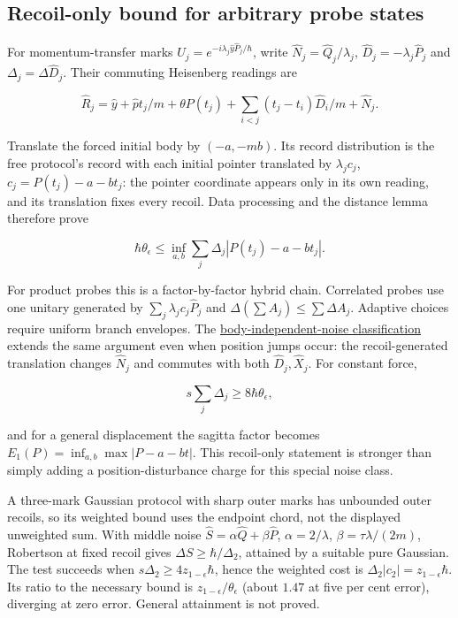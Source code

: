 \documentclass[11pt,a4paper]{article}
\begin{document}
\hypertarget{recoil-only-bound-for-arbitrary-probe-states}{%
\subsection{Recoil-only bound for arbitrary probe
states}\label{recoil-only-bound-for-arbitrary-probe-states}}

For momentum-transfer marks \(U_j=e^{-i\lambda_j\hat y\hat P_j/\hbar}\),
write \(\hat N_j=\hat Q_j/\lambda_j\), \(\hat D_j=-\lambda_j\hat P_j\)
and \(\Delta_j=\Delta\hat D_j\). Their commuting Heisenberg readings are

\[\hat R_j=\hat y+\hat p t_j/m+\theta P(t_j)
 +\sum_{i<j}(t_j-t_i)\hat D_i/m+\hat N_j.\]

Translate the forced initial body by \((-a,-mb)\). Its record
distribution is the free protocol's record with each initial pointer
translated by \(\lambda_jc_j\), \(c_j=P(t_j)-a-bt_j\): the pointer
coordinate appears only in its own reading, and its translation fixes
every recoil. Data processing and the distance lemma therefore prove

\[\hbar\theta_\epsilon\le\inf_{a,b}\sum_j\Delta_j|P(t_j)-a-bt_j|.\]

For product probes this is a factor-by-factor hybrid chain. Correlated
probes use one unitary generated by \(\sum_j\lambda_jc_j\hat P_j\) and
\(\Delta(\sum A_j)\le\sum\Delta A_j\). Adaptive choices require uniform
branch envelopes. The
\href{mark-cost-and-statistical-floor.md\#quantum-probe-cost-and-body-independent-noise}{body-independent-noise
classification} extends the same argument even when position jumps
occur: the recoil-generated translation changes \(\hat N_j\) and
commutes with both \(\hat D_j,\hat X_j\). For constant force,

\[\boxed{s\sum_j\Delta_j\ge8\hbar\theta_\epsilon,}\]

and for a general displacement the sagitta factor becomes
\(E_1(P)=\inf_{a,b}\max|P-a-bt|\). This recoil-only statement is
stronger than simply adding a position-disturbance charge for this
special noise class.

A three-mark Gaussian protocol with sharp outer marks has unbounded
outer recoils, so its weighted bound uses the endpoint chord, not the
displayed unweighted sum. With middle noise
\(\hat S=\alpha\hat Q+\beta\hat P\), \(\alpha=2/\lambda\),
\(\beta=\tau\lambda/(2m)\), Robertson at fixed recoil gives
\(\Delta S\ge\hbar/\Delta_2\), attained by a suitable pure Gaussian. The
test succeeds when \(s\Delta_2\ge4z_{1-\epsilon}\hbar\), hence the
weighted cost is \(\Delta_2|c_2|=z_{1-\epsilon}\hbar\). Its ratio to the
necessary bound is \(z_{1-\epsilon}/\theta_\epsilon\) (about \(1.47\) at
five per cent error), diverging at zero error. General attainment is not
proved.
\end{document}
